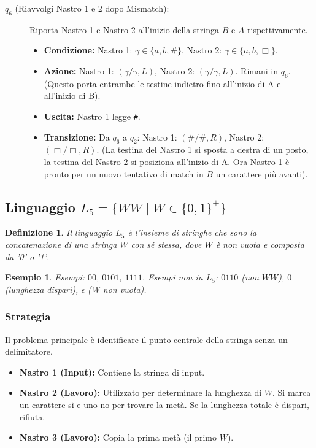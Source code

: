 \documentclass[a4paper, 11pt]{book} %
\newtheorem{definition}[theorem]{Definizione}
\newtheorem{example}[theorem]{Esempio}
\theoremstyle{definition}
\begin{document}
\begin{description}
    \item[$q_6$ (Riavvolgi Nastro 1 e 2 dopo Mismatch):] Riporta Nastro 1 e Nastro 2 all'inizio della stringa $B$ e $A$ rispettivamente.
    \begin{itemize}
        \item \textbf{Condizione:} Nastro 1: $\gamma \in \{a,b,\#\}$, Nastro 2: $\gamma \in \{a,b,\Box\}$.
        \item \textbf{Azione:} Nastro 1: $(\gamma/\gamma, L)$, Nastro 2: $(\gamma/\gamma, L)$. Rimani in $q_6$. (Questo porta entrambe le testine indietro fino all'inizio di A e all'inizio di B).
        \item \textbf{Uscita:} Nastro 1 legge \texttt{\#}.
        \item \textbf{Transizione:} Da $q_6$ a $q_2$: Nastro 1: $(\#/\#, R)$, Nastro 2: $(\Box/\Box, R)$. (La testina del Nastro 1 si sposta a destra di un posto, la testina del Nastro 2 si posiziona all'inizio di A. Ora Nastro 1 è pronto per un nuovo tentativo di match in $B$ un carattere più avanti).
    \end{itemize}
\end{description}

\subsection{Linguaggio $L_5 = \{WW \mid W \in \{0,1\}^+\}$}
\begin{definition}
Il linguaggio $L_5$ è l'insieme di stringhe che sono la concatenazione di una stringa $W$ con sé stessa, dove $W$ è non vuota e composta da '0' o '1'.
\end{definition}
\begin{example}
Esempi: $00$, $0101$, $1111$.
Esempi non in $L_5$: $0110$ (non $WW$), $0$ (lunghezza dispari), $\epsilon$ (W non vuota).
\end{example}

\subsubsection{Strategia}
Il problema principale è identificare il punto centrale della stringa senza un delimitatore.
\begin{itemize}
    \item \textbf{Nastro 1 (Input):} Contiene la stringa di input.
    \item \textbf{Nastro 2 (Lavoro):} Utilizzato per determinare la lunghezza di $W$. Si marca un carattere sì e uno no per trovare la metà. Se la lunghezza totale è dispari, rifiuta.
    \item \textbf{Nastro 3 (Lavoro):} Copia la prima metà (il primo $W$).
\end{itemize}
\end{document}
